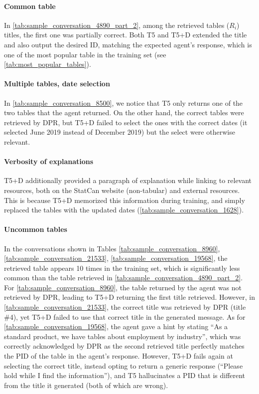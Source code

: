 \documentclass[11pt]{article}
\begin{document}
\paragraph{Common table} In \autoref{tab:sample_conversation_4890_part_2}, among the retrieved tables ($R_i$) titles, the first one was partially correct. Both T5 and T5+D extended the title and also output the desired ID, matching the expected agent's response, which is one of the most popular table in the training set (see \autoref{tab:most_popular_tables}).

\paragraph{Multiple tables, date selection} In \autoref{tab:sample_conversation_8500}, we notice that T5 only returns one of the two tables that the agent returned. On the other hand, the correct tables were retrieved by DPR, but T5+D failed to select the ones with the correct dates (it selected June 2019 instead of December 2019) but the select were otherwise relevant. 

\paragraph{Verbosity of explanations} T5+D additionally provided a paragraph of explanation while linking to relevant resources, both on the StatCan website (non-tabular) and external resources. This is because T5+D memorized this information during training, and simply replaced the tables with the updated dates (\autoref{tab:sample_conversation_1628}).

\paragraph{Uncommon tables} In the conversations shown in Tables \ref{tab:sample_conversation_8960}, \ref{tab:sample_conversation_21533}, \ref{tab:sample_conversation_19568}, the retrieved table appears 10 times in the training set, which is significantly less common than the table retrieved in \autoref{tab:sample_conversation_4890_part_2}. For \autoref{tab:sample_conversation_8960}, the table returned by the agent was not retrieved by DPR, leading to T5+D returning the first title retrieved. However, in \autoref{tab:sample_conversation_21533}, the correct title was retrieved by DPR (title \#4), yet T5+D failed to use that correct title in the generated message. As for \autoref{tab:sample_conversation_19568}, the agent gave a hint by stating ``As a standard product, we have tables about employment by industry'', which was correctly acknowledged by DPR as the second retrieved title perfectly matches the PID of the table in the agent's response. However, T5+D fails again at selecting the correct title, instead opting to return a generic response (``Please hold while I find the information''), and T5 hallucinates a PID that is different from the title it generated (both of which are wrong).
\end{document}
